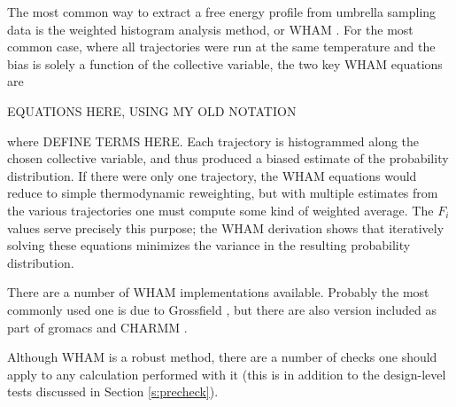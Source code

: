 
The most common way to extract a free energy profile from umbrella sampling data
is the weighted histogram analysis method, or WHAM \cite{Swendsen-1995, Roux-1995, Swendsen-1992}.
For the most common case, where all
trajectories were run at the same temperature and the bias is solely a function
of the collective variable, the two key WHAM equations are

EQUATIONS HERE, USING MY OLD NOTATION

where DEFINE TERMS HERE. Each trajectory is histogrammed along the chosen
collective variable, and thus produced a biased estimate of the probability
distribution. If there were only one trajectory, the WHAM equations would reduce
to simple thermodynamic reweighting, but with multiple estimates from the
various trajectories one must compute some kind of weighted average.  The  $F_i$
values serve precisely this purpose; the WHAM derivation shows that iteratively
solving these equations minimizes the variance in the resulting probability
distribution.

There are a number of WHAM implementations available.  Probably the most commonly used one is due to Grossfield \cite{WHAM}, but there are also version included as part of gromacs \cite{Lindahl-2013} and CHARMM \cite{CHARMM2009}.

Although WHAM is a robust method, there are a number of checks one should apply
to any calculation performed with it (this is in addition to the design-level
tests discussed in Section \ref{s:precheck}).

